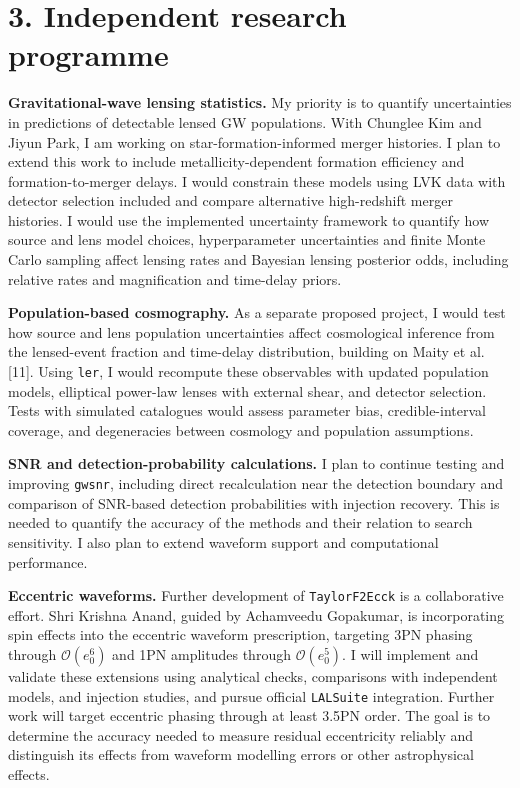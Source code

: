 \documentclass[11pt]{article}
\begin{document}
\section*{3. Independent research programme}
\textbf{Gravitational-wave lensing statistics.} My priority is to quantify uncertainties in predictions of detectable lensed GW populations. With Chunglee Kim and Jiyun Park, I am working on star-formation-informed merger histories. I plan to extend this work to include metallicity-dependent formation efficiency and formation-to-merger delays. I would constrain these models using LVK data with detector selection included and compare alternative high-redshift merger histories. I would use the implemented uncertainty framework to quantify how source and lens model choices, hyperparameter uncertainties and finite Monte Carlo sampling affect lensing rates and Bayesian lensing posterior odds, including relative rates and magnification and time-delay priors.

\textbf{Population-based cosmography.} As a separate proposed project, I would test how source and lens population uncertainties affect cosmological inference from the lensed-event fraction and time-delay distribution, building on Maity et al. [11]. Using \texttt{ler}, I would recompute these observables with updated population models, elliptical power-law lenses with external shear, and detector selection. Tests with simulated catalogues would assess parameter bias, credible-interval coverage, and degeneracies between cosmology and population assumptions.

\textbf{SNR and detection-probability calculations.} I plan to continue testing and improving \texttt{gwsnr}, including direct recalculation near the detection boundary and comparison of SNR-based detection probabilities with injection recovery. This is needed to quantify the accuracy of the methods and their relation to search sensitivity. I also plan to extend waveform support and computational performance.

\textbf{Eccentric waveforms.} Further development of \texttt{TaylorF2Ecck} is a collaborative effort. Shri Krishna Anand, guided by Achamveedu Gopakumar, is incorporating spin effects into the eccentric waveform prescription, targeting 3PN phasing through $\mathcal{O}(e_0^6)$ and 1PN amplitudes through $\mathcal{O}(e_0^5)$. I will implement and validate these extensions using analytical checks, comparisons with independent models, and injection studies, and pursue official \texttt{LALSuite} integration. Further work will target eccentric phasing through at least 3.5PN order. The goal is to determine the accuracy needed to measure residual eccentricity reliably and distinguish its effects from waveform modelling errors or other astrophysical effects.
\end{document}
